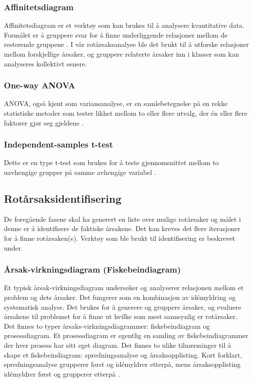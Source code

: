 \subsubsection{Affinitetsdiagram}
Affinitetsdiagram er et verktøy som kan brukes til å analysere kvantitative data. Formålet er å gruppere svar for å finne underliggende relasjoner mellom de resterende gruppene \cite{RCA}. I vår rotårsaksanalyse ble det brukt til å utforske relasjoner mellom forskjellige årsaker, og gruppere relaterte årsaker inn i klasser som kan analyseres kollektivt senere. 

\subsubsection{One-way ANOVA}
ANOVA, også kjent som variansanalyse, er en samlebetegnelse på en rekke statistiske metoder som tester likhet mellom to eller flere utvalg, der én eller flere faktorer gjør seg gjeldene \cite{ANOVA}. 

\subsubsection{Independent-samples t-test}
Dette er en type t-test som brukes for å teste gjennomsnittet mellom to uavhengige grupper på samme avhengige variabel \cite{t-test}. 

\subsection{Rotårsaksidentifisering}
De foregående fasene skal ha generert en liste over mulige rotårsaker og målet i denne er å identifisere de faktiske årsakene. Det kan kreves det flere iterasjoner for å finne rotårsaken(e). Verktøy som ble brukt til identifisering er beskrevet under. 

\subsubsection{Årsak-virkningsdiagram (Fiskebeindiagram)}
Et typisk årsak-virkningsdiagram undersøker og analyserer relasjonen mellom et problem og dets årsaker. Det fungerer som en kombinasjon av idémyldring og systematisk analyse. Det brukes for å generere og gruppere årsaker, og evaluere årsakene til problemet for å finne ut hvilke som mest sannsynlig er rotårsaker. Det finnes to typer årsaks-virkningsdiagrammer: fiskebeindiagram og prosessdiagram. Et prosessdiagram er egentlig en samling av fiskebeindiagrammer der hver prosess har sitt eget diagram. Det finnes to ulike tilnærminger til å skape et fiskebeindiagram: spredningsanalyse og årsaksopplisting. Kort forklart, spredningsanalyse grupperer først og idémyldrer etterpå, mens årsaksopplisting idémyldrer først og grupperer etterpå \cite{RCA}. 

